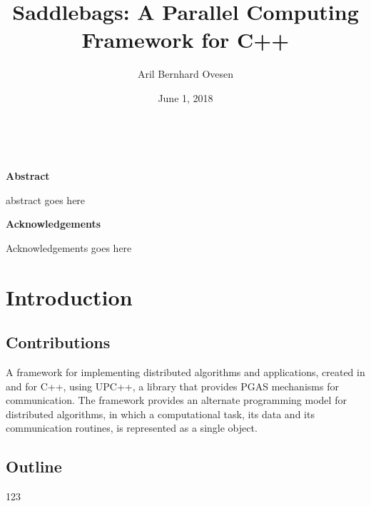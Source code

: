\documentclass{uit-report}
\begin{document}
\title{Saddlebags: A Parallel Computing Framework for C++}
\subtitle{}
\author{Aril Bernhard Ovesen}
\date{June 1, 2018}




\newpage\
\pagestyle{empty}

\mbox{}

\pagebreak
{}
\pagestyle{firststyle}
\textbf{\large{Abstract}}

abstract goes here


\newpage
\textbf{\large{Acknowledgements}}

Acknowledgements goes here


\newpage
\tableofcontents
\pagebreak

\newpage
{}
\pagestyle{secondstyle}
\setcounter{page}{1}
\section{Introduction}





\subsection{Contributions}
A framework for implementing distributed algorithms and applications, created in and for C++, using UPC++, a library that provides PGAS mechanisms for communication. The framework provides an alternate programming model for distributed algorithms, in which a computational task, its data and its communication routines, is represented as a single object. 



\subsection{Outline}
123
\end{document}
